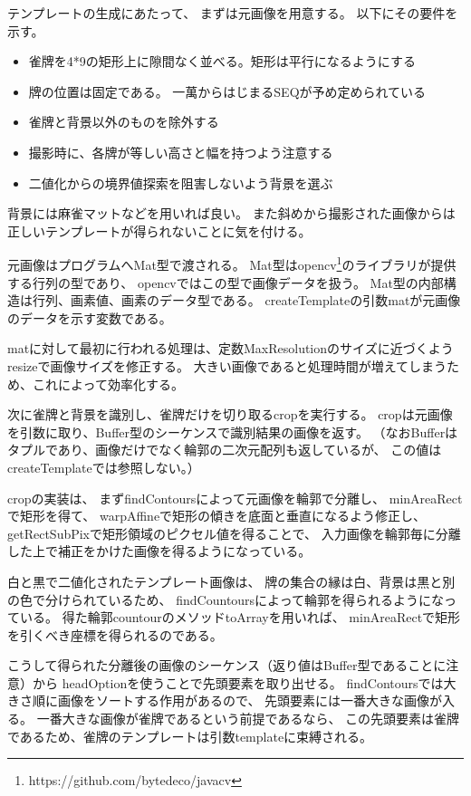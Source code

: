 \documentclass{jsarticle}
\begin{document}
\begin{multicols}{2}
テンプレートの生成にあたって、
まずは元画像を用意する。
以下にその要件を示す。
\begin{itemize}
\item 雀牌を4*9の矩形上に隙間なく並べる。矩形は平行になるようにする
\item 牌の位置は固定である。
		  一萬からはじまるSEQが予め定められている
\item 雀牌と背景以外のものを除外する
\item 撮影時に、各牌が等しい高さと幅を持つよう注意する
\item 二値化からの境界値探索を阻害しないよう背景を選ぶ
\end{itemize}

背景には麻雀マットなどを用いれば良い。
また斜めから撮影された画像からは正しいテンプレートが得られないことに気を付ける。

元画像はプログラムへMat型で渡される。
Mat型はopencv\footnote{https://github.com/bytedeco/javacv}のライブラリが提供する行列の型であり、
opencvではこの型で画像データを扱う。
Mat型の内部構造は行列、画素値、画素のデータ型である。
createTemplateの引数matが元画像のデータを示す変数である。

matに対して最初に行われる処理は、定数MaxResolutionのサイズに近づくよう
resizeで画像サイズを修正する。
大きい画像であると処理時間が増えてしまうため、これによって効率化する。

次に雀牌と背景を識別し、雀牌だけを切り取るcropを実行する。
cropは元画像を引数に取り、Buffer型のシーケンスで識別結果の画像を返す。
（なおBufferはタプルであり、画像だけでなく輪郭の二次元配列も返しているが、
この値はcreateTemplateでは参照しない。）

cropの実装は、
まずfindContoursによって元画像を輪郭で分離し、
minAreaRectで矩形を得て、
warpAffineで矩形の傾きを底面と垂直になるよう修正し、
getRectSubPixで矩形領域のピクセル値を得ることで、
入力画像を輪郭毎に分離した上で補正をかけた画像を得るようになっている。

白と黒で二値化されたテンプレート画像は、
牌の集合の縁は白、背景は黒と別の色で分けられているため、
findCountoursによって輪郭を得られるようになっている。
得た輪郭countourのメソッドtoArrayを用いれば、
minAreaRectで矩形を引くべき座標を得られるのである。

こうして得られた分離後の画像のシーケンス（返り値はBuffer型であることに注意）から
headOptionを使うことで先頭要素を取り出せる。
findContoursでは大きさ順に画像をソートする作用があるので、
先頭要素には一番大きな画像が入る。
一番大きな画像が雀牌であるという前提であるなら、
この先頭要素は雀牌であるため、雀牌のテンプレートは引数templateに束縛される。


\end{multicols}
\end{document}
